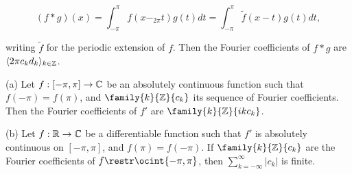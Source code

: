 $$(f*g)(x)=\int_{-\pi}^{\pi}f(x-_{2\pi}t)g(t)dt
=\int_{-\pi}^{\pi}\tilde f(x-t)g(t)dt,$$

\noindent{} writing $\tilde f$ for the periodic
extension of $f$.   Then the Fourier coefficients of $f*g$
are $\langle 2\pi c_kd_k\rangle_{k\in\Bbb Z}$.


 (a) Let $f:[-\pi,\pi]\to\Bbb C$ be an
absolutely continuous function such that $f(-\pi)=f(\pi)$, and
$\family{k}{\Bbb Z}{c_k}$ its sequence of Fourier coefficients.   Then
the Fourier coefficients of $f'$ are $\family{k}{\Bbb Z}{ikc_k}$.

(b)
Let $f:\Bbb R\to\Bbb C$ be a differentiable function such that $f'$
is absolutely continuous on $[-\pi,\pi]$, and $f(\pi)=f(-\pi)$.
If $\family{k}{\Bbb Z}{c_k}$ are the Fourier coefficients of
$f\restr\ocint{-\pi,\pi}$, then
$\sum_{k=-\infty}^{\infty}|c_k|$ is finite.

